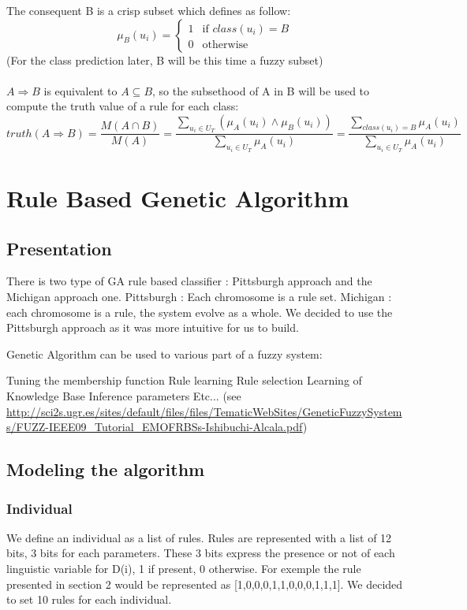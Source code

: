 \documentclass[a4paper,12pt]{article}
\begin{document}
The consequent B is a crisp subset which defines as follow:
\[\mu_B(u_i)=
\begin{cases}
	1 & \text{if $class(u_i)=B$}\\
	0 & \text{otherwise}
\end{cases}\]
(For the class prediction later, B will be this time a fuzzy subset)\\
\\
$A\Rightarrow B$ is equivalent to $A\subseteq B$, so the subsethood of A in B will be used to compute the truth value of a rule for each class:
\[
	truth(A\Rightarrow B)=
	\frac{M(A\cap B)}{M(A)}=
	\frac
		{\sum\limits_{u_i\in U_T}{(\mu_A(u_i)\land \mu_B(u_i))}}
		{\sum\limits_{u_i\in U_T}{\mu_A(u_i)}}=
	\frac
		{\sum\limits_{class(u_i)=B}{\mu_A(u_i)}}
		{\sum\limits_{u_i\in U_T}{\mu_A(u_i)}}
\]

\section{Rule Based Genetic Algorithm}

\subsection{Presentation}

There is two type of GA rule based classifier : Pittsburgh approach and the Michigan approach one. Pittsburgh : Each chromosome is a rule set. Michigan : each chromosome is a rule, the system evolve as a whole. We decided to use the Pittsburgh approach as it was more intuitive for us to build.


Genetic Algorithm can be used to various part of a fuzzy system:

Tuning the membership function
Rule learning
Rule selection
Learning of Knowledge Base
Inference parameters
Etc... (see \url{http://sci2s.ugr.es/sites/default/files/files/TematicWebSites/GeneticFuzzySystems/FUZZ-IEEE09_Tutorial_EMOFRBSs-Ishibuchi-Alcala.pdf})

\subsection{Modeling the algorithm}

\subsubsection{Individual}

We define an individual as a list of rules. Rules are represented with a list of 12 bits, 3 bits for each parameters.
These 3 bits express the presence or not of each linguistic variable for D(i), 1 if present, 0 otherwise.
For exemple the rule presented in section 2 would be represented as [1,0,0,0,1,1,0,0,0,1,1,1].
We decided to set 10 rules for each individual.
\end{document}
